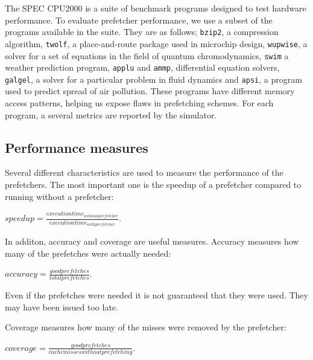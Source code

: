The SPEC CPU2000\cite{bib:cpu2000} is a suite of benchmark programs designed to test hardware performance.
To evaluate prefetcher performance, we use a subset of the programs available in the suite.
They are as follows; \texttt{bzip2}, a compression algorithm, \texttt{twolf},
a place-and-route package used in microchip design, \texttt{wupwise}, a solver for a set of
equations in the field of quantum chromodynamics, \texttt{swim} a weather prediction program,
\texttt{applu} and \texttt{ammp}, differential equation solvers, \texttt{galgel}, a solver for a
particular problem in fluid dynamics and \texttt{apsi}, a program used to predict spread of air pollution.
These programs have different memory access patterns, helping us expose flaws in prefetching schemes.
For each program, a several metrics are reported by the simulator.

\subsection{Performance measures}
Several different characteristics are used to measure the performance
of the prefetchers. The most important one is the speedup of a
prefetcher compared to running without a prefetcher:

$speedup = \frac{execution time_{without prefetcher}}{execution time_{with prefetcher}}$.

In additon, accuracy and coverage are useful measures. Accuracy measures
how many of the prefetches were actually needed:

$accuracy = \frac{good prefetches}{total prefetches}$.

Even if the prefetches were needed it is not guaranteed that they
were used. They may have been issued too late.

Coverage measures how many of the misses were removed by the
prefetcher:

$coverage = \frac{good prefetches}{cache misses without prefetching}$.

\cite{bib:doc}
